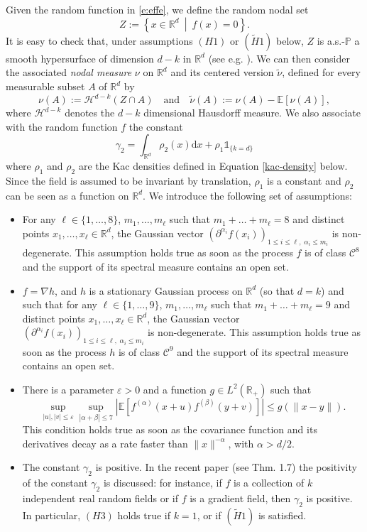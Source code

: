 \documentclass[11pt,a4paper]{article}
\newcommand\HH{\mathcal{H}}
\newcommand\R{\mathbb{R}}
\newcommand\E{\mathbb{E}}
\newcommand\dd{\mathrm{d}}
\newcommand\CC{\mathcal{C}}
\newcommand\nut{\tilde{\nu}}
\newcommand{\enstq}[2]{\left\{#1~\middle|~#2\right\}}
\newcommand\one{\mathds{1}}
\newcommand\quand{\quad\text{and}\quad}
\numberwithin{equation}{section}
\theoremstyle{plain}
\theoremstyle{plain}
\theoremstyle{plain}
\theoremstyle{plain}
\theoremstyle{definition}
\theoremstyle{definition}
\begin{document}
Given the random function in \eqref{e:effe}, we define the random nodal set
\[Z := \enstq{x\in \R^d}{f(x) = 0}.\]
It is easy to check that, under assumptions $(H1)$ or $(\widetilde{H}1)$ below, $Z$ is a.s.-$\mathbb{P}$ a smooth hypersurface of dimension $d-k$ in $\R^d$ (see e.g. \cite{Aza09, ATaylor}). We can then consider the associated {\it nodal measure} $\nu$ on $\R^d$ and its centered version $\nut$, defined for every measurable subset $A$ of $\R^d$ by
\begin{equation}\label{e:nueffe}
\nu(A) := \HH^{d-k}(Z\cap A)\quand \nut(A) := \nu(A)-\E[\nu(A)],
\end{equation}
where $\HH^{d-k}$ denotes the $d-k$ dimensional Hausdorff measure. We also associate with the random function $f$ the constant
\begin{equation}\label{e:gamma2}
\gamma_2 = \int_{\R^d} \rho_2(x)\dd x + \rho_1\one_{\{k=d\}}
\end{equation}
where $\rho_1$ and $\rho_2$ are the Kac densities defined in Equation \eqref{kac-density} below. Since the field is assumed to be invariant by translation, $\rho_1$ is a constant and $\rho_2$ can be seen as a function on $\R^d$.
We introduce the following set of assumptions:
\begin{itemize}
\item[$(H1)$] For any $\ell\in\{1,\ldots,8\}$, $m_1,\ldots,m_\ell$ such that $m_1+\ldots+m_\ell = 8$ and distinct points $x_1,\ldots,x_\ell\in\R^d$, the Gaussian vector $(\partial^{\alpha_i} f(x_i))_{1\leq i\leq \ell, \;\alpha_i\leq m_i}$ is non-degenerate. This assumption holds true as soon as the process $f$ is of class $\CC^8$ and the support of its spectral measure contains an open set.
\item[$(\widetilde{H}1)$] $f = \nabla h$, and $h$ is a stationary Gaussian process on $\R^d$ (so that $d=k$) and such that for any $\ell\in\{1,\ldots,9\}$, $m_1,\ldots,m_\ell$ such that $m_1+\ldots+m_\ell = 9$ and distinct points $x_1,\ldots,x_\ell\in\R^d$, the Gaussian vector $(\partial^{\alpha_i} f(x_i))_{1\leq i\leq \ell, \;\alpha_i\leq m_i}$ is non-degenerate. This assumption holds true as soon as the process $h$ is of class $\CC^9$ and the support of its spectral measure contains an open set.
\item[$(H2)$] There is a parameter $\varepsilon>0$ and a function $g\in L^2(\R_+)$ such that
\[\sup_{|u|,|v|\leq \varepsilon}\sup_{|\alpha + \beta|\leq 7} |\E[f^{(\alpha)}(x+u)f^{(\beta)}(y+v)]|\leq g(\|x-y\|).\]
This condition holds true as soon as the covariance function and its derivatives decay as a rate faster than $\|x\|^{-\alpha}$, with $\alpha>d/2$.
\item[$(H3)$] The constant $\gamma_2$ is positive. In the recent paper \cite{Gas25} (see Thm. 1.7) the positivity of the constant $\gamma_2$ is discussed: for instance, if $f$ is a collection of $k$ independent real random fields or if $f$ is a gradient field, then $\gamma_2$ is positive. In particular, $(H3)$ holds true if $k=1$, or if $(\widetilde{H}1)$ is satisfied.
\end{itemize}
\end{document}
